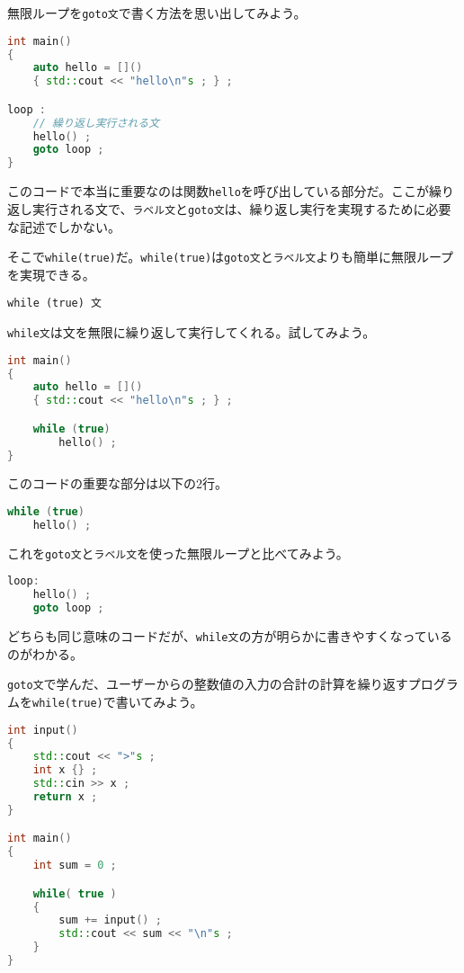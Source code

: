 
無限ループを\texttt{goto文}で書く方法を思い出してみよう。

\begin{lstlisting}[language={C++}]
int main()
{
    auto hello = []()
    { std::cout << "hello\n"s ; } ;

loop :
    // 繰り返し実行される文
    hello() ;
    goto loop ;
}
\end{lstlisting}

このコードで本当に重要なのは関数\texttt{hello}を呼び出している部分だ。ここが繰り返し実行される文で、\texttt{ラベル文}と\texttt{goto文}は、繰り返し実行を実現するために必要な記述でしかない。

そこで\texttt{while(true)}だ。\texttt{while(true)}は\texttt{goto文}と\texttt{ラベル文}よりも簡単に無限ループを実現できる。

\begin{lstlisting}[style=grammar]
while (true) 文
\end{lstlisting}

\texttt{while文}は文を無限に繰り返して実行してくれる。試してみよう。

\begin{lstlisting}[language={C++}]
int main()
{
    auto hello = []()
    { std::cout << "hello\n"s ; } ;

    while (true)
        hello() ;
}
\end{lstlisting}

このコードの重要な部分は以下の2行。

\begin{lstlisting}[language={C++}]
while (true)
    hello() ;
\end{lstlisting}

これを\texttt{goto文}と\texttt{ラベル文}を使った無限ループと比べてみよう。

\begin{lstlisting}[language={C++}]
loop:
    hello() ;
    goto loop ;
\end{lstlisting}

どちらも同じ意味のコードだが、\texttt{while文}の方が明らかに書きやすくなっているのがわかる。

\texttt{goto文}で学んだ、ユーザーからの整数値の入力の合計の計算を繰り返すプログラムを\texttt{while(true)}で書いてみよう。

\begin{lstlisting}[language={C++}]
int input()
{
    std::cout << ">"s ;
    int x {} ;
    std::cin >> x ;
    return x ;
}

int main()
{
    int sum = 0 ;

    while( true )
    {
        sum += input() ;
        std::cout << sum << "\n"s ;
    }
}
\end{lstlisting}

